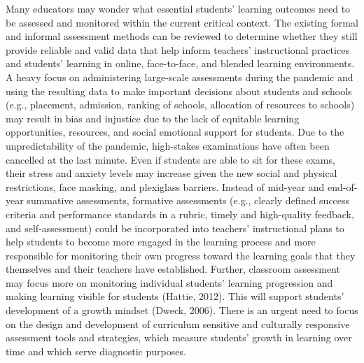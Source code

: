 \documentclass[
]{book}
\begin{document}
Many educators may wonder what essential students' learning outcomes need to be assessed and monitored within the current critical context. The existing formal and informal assessment methods can be reviewed to determine whether they still provide reliable and valid data that help inform teachers' instructional practices and students' learning in online, face-to-face, and blended learning environments. A heavy focus on administering large-scale assessments during the pandemic and using the resulting data to make important decisions about students and schools (e.g., placement, admission, ranking of schools, allocation of resources to schools) may result in bias and injustice due to the lack of equitable learning opportunities, resources, and social emotional support for students. Due to the unpredictability of the pandemic, high-stakes examinations have often been cancelled at the last minute. Even if students are able to sit for these exams, their stress and anxiety levels may increase given the new social and physical restrictions, face masking, and plexiglass barriers. Instead of mid-year and end-of-year summative assessments, formative assessments (e.g., clearly defined success criteria and performance standards in a rubric, timely and high-quality feedback, and self-assessment) could be incorporated into teachers' instructional plans to help students to become more engaged in the learning process and more responsible for monitoring their own progress toward the learning goals that they themselves and their teachers have established. Further, classroom assessment may focus more on monitoring individual students' learning progression and making learning visible for students (Hattie, 2012). This will support students' development of a growth mindset (Dweck, 2006). There is an urgent need to focus on the design and development of curriculum sensitive and culturally responsive assessment tools and strategies, which measure students' growth in learning over time and which serve diagnostic purposes.
\end{document}
